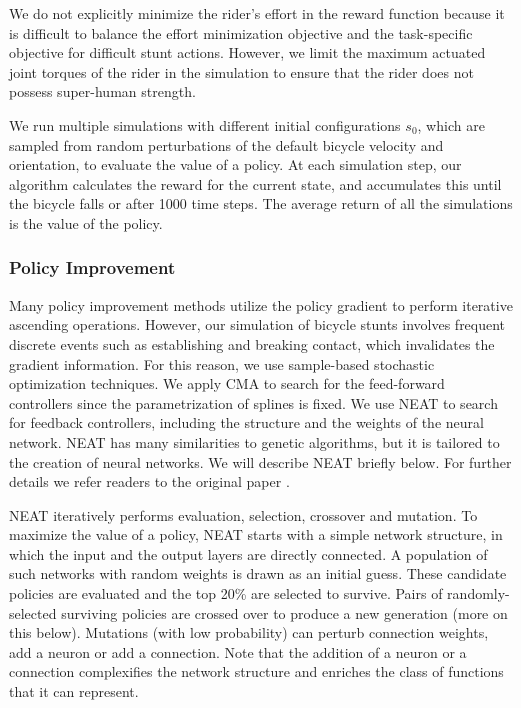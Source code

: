 We do not explicitly minimize the rider's effort in the reward function because it is difficult to balance the effort minimization objective and the task-specific objective for difficult stunt actions. However, we limit the maximum actuated joint torques of the rider in the simulation to ensure that the rider does not possess super-human strength.

We run multiple simulations with different initial configurations $s_0$, which are sampled from random perturbations of the default bicycle velocity and orientation, to evaluate the value of a policy. At each simulation step, our algorithm calculates the reward for the current state, and accumulates this until the bicycle falls or after 1000 time steps. The average return of all the simulations is the value of the policy.

\subsubsection{Policy Improvement}
\label{sec:improvement}

Many policy improvement methods utilize the policy gradient \cite{Peters:2008} to perform iterative ascending operations. However, our simulation of bicycle stunts involves frequent discrete events such as establishing and breaking contact, which invalidates the gradient information. For this reason, we use sample-based stochastic optimization techniques. We apply CMA to search for the feed-forward controllers since the parametrization of splines is fixed. We use NEAT to search for feedback controllers, including the structure and the weights of the neural network. NEAT has many similarities to genetic algorithms, but it is tailored to the creation of neural networks. We will describe NEAT briefly below. For further details we refer readers to the original paper \cite{Stanley:2002:ENN}.

NEAT iteratively performs evaluation, selection, crossover and mutation. To maximize the value of a policy, NEAT starts with a simple network structure, in which the input and the output layers are directly connected. A population of such networks with random weights is drawn as an initial guess. These candidate policies are evaluated and the top 20\% are selected to survive. Pairs of randomly-selected surviving policies are crossed over to produce a new generation (more on this below). Mutations (with low probability) can perturb connection weights, add a neuron or add a connection. Note that the addition of a neuron or a connection complexifies the network structure and enriches the class of functions that it can represent.

